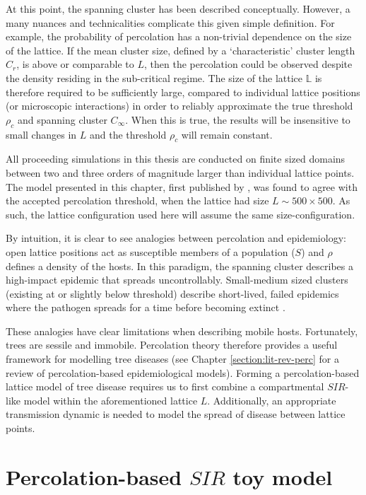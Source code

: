 At this point, the spanning cluster has been described conceptually. %
However, a  many nuances and technicalities complicate this given simple definition. %
For example, the probability of percolation has a non-trivial dependence on the size of the lattice. %
If the mean cluster size, defined by a `characteristic' cluster length $C_r$, is above or comparable to $L$, then the percolation could be observed despite the density residing in the sub-critical regime. %
The size of the lattice $\mathbb{L}$ is therefore required to be sufficiently large, compared to individual lattice positions (or microscopic interactions) in order to reliably approximate the true threshold $\rho_c$ and spanning cluster $C_{\infty}$. %
When this is true, the results will be insensitive to small changes in $L$ and the threshold $\rho_c$ will remain constant. %

All proceeding simulations in this thesis are conducted on finite sized domains between two and three orders of magnitude larger than individual lattice points. %
The model presented in this chapter, first published by \cite{OROZCOFUENTES201912}, was found to agree with the accepted percolation threshold, when the lattice had size $L \sim 500\times500$. %
As such, the lattice configuration used here will assume the same size-configuration. %

By intuition, it is clear to see analogies between percolation and epidemiology: open lattice positions act as susceptible members of a population ($S$) and $\rho$ defines a density of the hosts. %
In this paradigm, the spanning cluster describes a high-impact epidemic that spreads uncontrollably. %
Small-medium sized clusters (existing at or slightly below threshold) describe short-lived, failed epidemics where the pathogen spreads for a time before becoming extinct \cite{gilligan2008epidemiological}. %

These analogies have clear limitations when describing mobile hosts. %
Fortunately, trees are sessile and immobile. %
Percolation theory therefore provides a useful framework for modelling tree diseases (see Chapter \ref{section:lit-rev-perc} for a review of percolation-based epidemiological models). %
Forming a percolation-based lattice model of tree disease requires us to first combine a compartmental $SIR$-like model within the aforementioned lattice $L$. %
Additionally, an appropriate transmission dynamic is needed to model the spread of disease between lattice points. %


\section{Percolation-based $SIR$ toy model}


